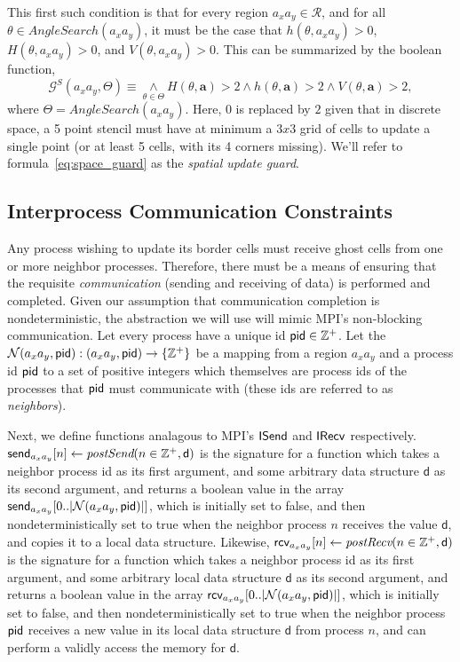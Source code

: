 This first such condition is that for every region $a_xa_y \in \mathcal{R}$, and for all
$\theta\in AngleSearch(a_xa_y)$, it must be the case that $h(\theta,a_xa_y) > 0$,
$H(\theta,a_xa_y) > 0$, and $V(\theta,a_xa_y) > 0$.  This can be summarized by the
boolean function,
\begin{equation}
    \mathcal{G}^S(a_xa_y,\Theta) \equiv \underset{\theta \in \Theta}{\wedge}
    H(\theta,\mathbf{a}) > 2 \wedge
    h(\theta,\mathbf{a}) > 2 \wedge
    V(\theta,\mathbf{a}) > 2,
    \label{eq:space_guard}
\end{equation}
where $\Theta = AngleSearch(a_xa_y)$.
Here, $0$ is replaced by $2$ given that in discrete space, a 5 point stencil must have at
minimum a $3x3$ grid of cells to update a single point
(or at least 5 cells, with its 4 corners missing).  We'll refer to formula~\ref{eq:space_guard}
as the {\it spatial update guard}.

\subsection{Interprocess Communication Constraints}

Any process wishing to update its border cells must receive ghost
cells from one or more neighbor processes.
Therefore, there must be a means of ensuring that the requisite
{\it communication} (sending and receiving of data) is performed
and completed.
Given our assumption that communication completion is nondeterministic, the abstraction
we will use will mimic MPI's non-blocking communication.  Let
every process have a unique id $\textup{\textsf{pid}} \in \mathbb{Z}^+$.  Let
the $\mathcal{N}(a_xa_y,\textup{\textsf{pid}}): (a_xa_y,\textup{\textsf{pid}}) \rightarrow \{\mathbb{Z}^+\}$ be a mapping
from a region $a_xa_y$ and a process id $\textup{\textsf{pid}}$ to a set of positive
integers which themselves are process ids of the processes that
$\textup{\textsf{pid}}$ must communicate with (these ids are referred to as {\it neighbors}).

Next, we define functions analagous to MPI's
$\textsf{\textup{ISend}}$ and $\textsf{\textup{IRecv}}$ respectively.
$\textsf{send}_{a_xa_y}[n] \leftarrow \textit{postSend}(n\in\mathbb{Z}^+,\textsf{d})$ is the signature for
a function which takes a neighbor process id as its first argument, and some
arbitrary data structure $\textsf{d}$ as its second argument, and returns a boolean value
in the array $\textsf{send}_{a_xa_y}[0..|\mathcal{N}(a_xa_y,\textup{\textsf{pid}})|]$,
 which is initially set to false, and then
nondeterministically set to true when the neighbor process $n$ receives
the value $\textsf{d}$, and copies it to a local data structure.  Likewise,
$\textsf{rcv}_{a_xa_y}[n] \leftarrow \textit{postRecv}(n\in\mathbb{Z}^+,\textsf{d})$ is the signature for
a function which takes a neighbor process id as its first argument, and some
arbitrary local data structure $\textsf{d}$ as its second argument,
and returns a boolean value
in the array $\textsf{rcv}_{a_xa_y}[0..|\mathcal{N}(a_xa_y,\textup{\textsf{pid}})|]$,
 which is initially set to false, and then
nondeterministically set to true when the neighbor process
$\textup{\textsf{pid}}$ receives a new value in its local data structure $\textsf{d}$
from process $n$, and can perform a validly access the memory for $\textsf{d}$.

